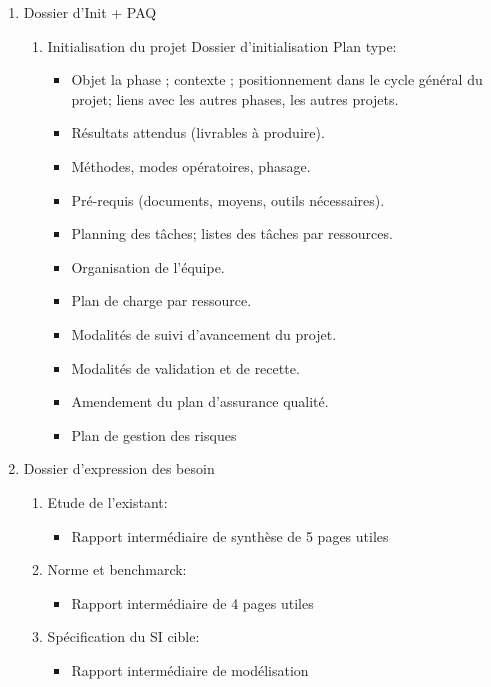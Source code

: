 
\begin{enumerate}
	\item Dossier d'Init + PAQ
		\begin{enumerate}
			\item Initialisation du projet
				Dossier d'initialisation
					Plan type:
						\begin{itemize}
							\item Objet la phase ; contexte ; positionnement dans le cycle général du projet; liens avec les autres phases, les autres projets.
							\item Résultats attendus (livrables à produire).
							\item Méthodes, modes opératoires, phasage.
							\item Pré-requis (documents, moyens, outils nécessaires).
							\item Planning des tâches; listes des tâches par ressources.
							\item Organisation de l’équipe.
							\item Plan de charge par ressource.
							\item Modalités de suivi d’avancement du projet.
							\item Modalités de validation et de recette.
							\item Amendement du plan d’assurance qualité.
							\item Plan de gestion des risques
						\end{itemize}
		\end{enumerate}
	\item Dossier d'expression des besoin
		\begin{enumerate}
			\item Etude de l'existant:
				\begin{itemize}
					\item Rapport intermédiaire de synthèse de 5 pages utiles
				\end{itemize}
			\item Norme et benchmarck:
				\begin{itemize} 
					\item Rapport intermédiaire de 4 pages utiles
				\end{itemize}
			\item Spécification du SI cible:
				\begin{itemize} 
					\item Rapport intermédiaire de modélisation
				\end{itemize}
		\end{enumerate}


\end{enumerate}
